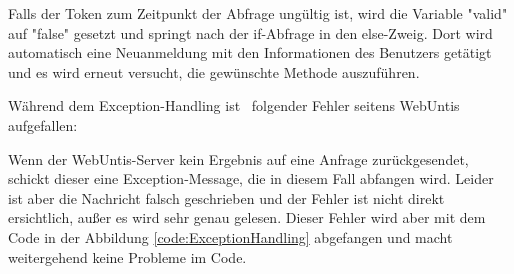 

Falls der Token zum Zeitpunkt der Abfrage ungültig ist, wird die Variable "valid" auf "false" gesetzt und springt nach der if-Abfrage in den else-Zweig. Dort wird automatisch eine Neuanmeldung mit den Informationen des Benutzers getätigt und es wird erneut versucht, die gewünschte Methode auszuführen.


Während dem Exception-Handling ist \ZELIA\ folgender Fehler seitens WebUntis aufgefallen:


Wenn der WebUntis-Server kein Ergebnis auf eine Anfrage zurückgesendet, schickt dieser eine Exception-Message, die in diesem Fall abfangen wird. Leider ist aber die Nachricht falsch geschrieben und der Fehler ist nicht direkt ersichtlich, außer es wird sehr genau gelesen. Dieser Fehler wird aber mit dem Code in der Abbildung \ref{code:ExceptionHandling} abgefangen und macht weitergehend keine Probleme im Code.